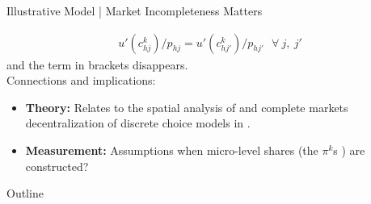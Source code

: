 \documentclass[9pt,pdftex,aspectratio=1610]{beamer}
\theoremstyle{definition}
\begin{document}
\begin{frame}[t]{Illustrative Model | Market Incompleteness Matters}
{\begin{align*}
u'( c_{hj}^k )/ p_{hj}  = u'( c_{hj'}^k )/ p_{hj'}  \ \ \ \forall\: j, \ j'
\end{align*}
and the term in brackets disappears.  \\
\medskip
Connections and implications:
\begin{itemize}
\item \textbf{Theory:} Relates to the spatial analysis of {\small \citet*{miyauchi2024unpacking}} and complete markets decentralization of discrete choice models in {\small \citet{mongey-waugh-2}}.
\smallskip
\item \textbf{Measurement:} Assumptions when micro-level shares (the $\pi^k$s ) are constructed?
\end{itemize}
}
\end{frame}


\begin{frame}[t]{Outline}
\smallskip
{}
\bigskip
{}
\bigskip{}
\end{frame}

\end{document}
